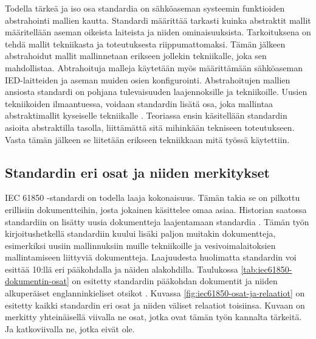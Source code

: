 Todella tärkeä ja iso osa standardia on sähköaseman systeemin funktioiden abstrahointi mallien kautta. Standardi määrittää tarkasti kuinka abstraktit mallit määritellään aseman oikeista laiteista ja niiden ominaisuuksista. Tarkoituksena on tehdä mallit tekniikasta ja toteutuksesta riippumattomaksi. Tämän jälkeen abstrahoidut mallit mallinnetaan erikseen jollekin tekniikalle, joka sen mahdollistaa. Abtrahoituja malleja käytetään myös määrittämään sähköaseman IED-laitteiden ja aseman muiden osien konfigurointi. Abstrahoitujen mallien ansiosta standardi on pohjana tulevaisuuden laajennoksille ja tekniikoille. Uusien tekniikoiden ilmaantuessa, voidaan standardin lisätä  osa, joka  mallintaa abstraktimallit kyseiselle tekniikalle \cite[s.~2]{Brunner2008}. Teoriassa ensin käsitellään standardin asioita abstraktilla tasolla, liittämättä sitä mihinkään tekniseen toteutukseen. Vasta tämän jälkeen se liitetään erikseen tekniikkaan mitä työssä käytettiin.


\subsection{Standardin eri osat ja niiden merkitykset}	
IEC 61850 -standardi on todella laaja kokonaisuus. Tämän takia se on pilkottu erillisiin dokumentteihin, josta jokainen käsittelee omaa asiaa. Historian saatossa standardiin on lisätty uusia dokumentteja laajentamaan standardia \cite{IEC61850series, New-documents-by-IEC-TC-57} \cite[s.~13]{IEC61850-1}. Tämän työn kirjoitushetkellä standardiin kuului lisäki paljon muitakin dokumentteja, esimerkiksi uusiin mallinnuksiin muille tekniikoille ja vesivoimalaitoksien mallintamiseen liittyviä dokumentteja. Laajuudesta huolimatta standardin voi esittää 10:llä eri pääkohdalla ja näiden alakohdilla. Taulukossa \ref{tab:iec61850-dokumentin-osat} on esitetty standardin pääkohdan dokumentit ja niiden alkuperäiset englanninkieliset otsikot \cite[s.~2]{Mackiewicz2006} \cite{IEC61850series}. Kuvassa \ref{fig:iec61850-osat-ja-relaatiot} on esitetty kaikki standardin eri osat ja niiden väliset relaatiot toisiinsa. Kuvaan on merkitty yhteinäisellä viivalla ne osat, jotka ovat tämän työn kannalta tärkeitä. Ja katkoviivalla ne, jotka eivät ole.

